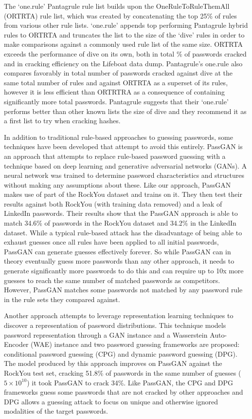 \documentclass{article}
\begin{document}
The `one.rule' Pantagrule rule list builds upon the OneRuleToRuleThemAll
(ORTRTA) rule list\autocite{ortrta}, which was created by concatenating the top
25\% of rules from various other rule lists. `one.rule' appends top performing
Pantagrule hybrid rules to ORTRTA and truncates the list to the size of
the `dive' rules in order to make comparisons against a commonly used rule list
of the same size. ORTRTA exceeds the performance of dive on its own, both in
total \% of passwords cracked and in cracking efficiency on the Lifeboat data
dump\autocite{ortrta}. Pantagrule's one.rule also compares favorably in total
number of passwords
cracked against dive at the same total number of rules and against ORTRTA as a
superset of its rules, however it is less efficient than ORTRTRA as a
consequence of containing significantly more total passwords. Pantagrule
suggests that their `one.rule' performs better than other known lists the size
of dive and they recommend it as a first list to try when cracking hashes.


In addition to traditional rule-based approaches to guessing passwords, some
techniques have been developed that attempt to avoid this entirely.
PassGAN\autocite{hitaj2019passgan} is an approach that attempts to replace
rule-based password guessing with a technique based on deep learning and
generative adversarial networks (GANs). A neural network was
trained to determine password characteristics and structures without making any
assumptions about these. Like our approach, PassGAN makes use of part of the
RockYou dataset and trains on it. They then test their results against both
RockYou (with training data removed) and a leak of LinkedIn passwords. Their
results show that the PassGAN approach is able to match 34.6\% of passwords in
the RockYou dataset and 34.2\% in the LinkedIn dataset. While a typical
rule-based attack has the disadvantage of being able to exhaust guesses once
all rules have been applied to all initial passwords, PassGAN can generate
guesses effectively forever. So while PassGAN can in theory eventually guess
more passwords than any other approach, it needs to generate significantly more
passwords to do this and can require up to 10x more guesses to reach the same
number of matched passwords as competitors. However, PassGAN matches some
passwords
not matched by any password rule in the rule sets they compared against.

Another approach\autocite{pasquini2021improving} attempts to leverage
representation learning techniques to discover a representation of password
distributions. This technique models password representation through a GAN
instance and a Wasserstein Auto-Encoder (WAE) instance and two password guessing
frameworks are proposed: conditional password guessing (CPG) and dynamic
password guessing (DPG). The model produced by this approach
improves on PassGAN against the RockYou test set, cracking 51.8\% of passwords
in the same number of guesses ($5 \times 10^{10}$) it took PassGAN to crack 34\%.
Like PassGAN, the CPG and DPG frameworks guess some passwords that are not
cracked by other approaches and DPG allows a guessing attack to focus on unique
and otherwise ignored modalities of the target passwords.
\end{document}
